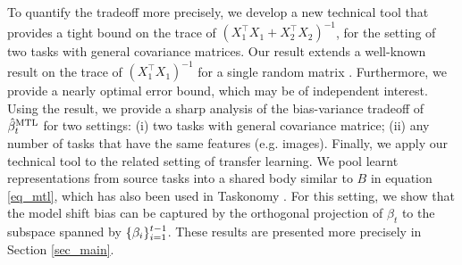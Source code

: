 To quantify the tradeoff more precisely, we develop a new technical tool that provides a tight bound on the trace of $(X_1^{\top}X_1 + X_2^{\top}X_2)^{-1}$, for the setting of two tasks with general covariance matrices.
Our result extends a well-known result on the trace of $(X_1^{\top}X_1)^{-1}$ for a single random matrix \cite{S07}.
Furthermore, we provide a nearly optimal error bound, which may be of independent interest.
Using the result, we provide a sharp analysis of the bias-variance tradeoff of $\hat{\beta}_t^{\text{MTL}}$ for two settings:
(i) two tasks with general covariance matrice; (ii) any number of tasks that have the same features (e.g. images).
Finally, we apply our technical tool to the related setting of transfer learning.
We pool learnt representations from source tasks into a shared body similar to $B$ in equation \eqref{eq_mtl}, which has also been used in Taskonomy \cite{ZSSGM18}.
For this setting, we show that the model shift bias can be captured by the orthogonal projection of $\beta_t$ to the subspace spanned by $\{\beta_i\}_{i=1}^{t-1}$.
These results are presented more precisely in Section \ref{sec_main}.

